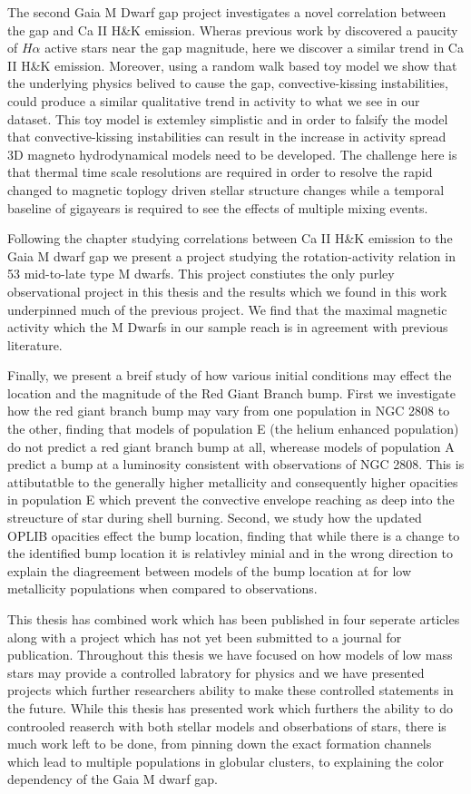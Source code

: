 The second Gaia M Dwarf gap project investigates a novel correlation between
the gap and Ca II H\&K emission. Wheras previous work by \citet{Jao2023}
discovered a paucity of $H\alpha$ active stars near the gap magnitude, here we
discover a similar trend in Ca II H\&K emission. Moreover, using a random walk
based toy model we show that the underlying physics belived to cause the gap,
convective-kissing instabilities, could produce a similar qualitative trend in
activity to what we see in our dataset. This toy model is extemley simplistic
and in order to falsify the model that convective-kissing instabilities can
result in the increase in activity spread 3D magneto hydrodynamical models need
to be developed. The challenge here is that thermal time scale resolutions are
required  in order to resolve the rapid changed to magnetic toplogy driven
stellar structure changes while a temporal baseline of gigayears is required to
see the effects of multiple mixing events. 

Following the chapter studying correlations between Ca II H\&K emission to the
Gaia M dwarf gap we present a project studying the rotation-activity relation
in 53 mid-to-late type M dwarfs. This project constiutes the only purley
observational project in this thesis and the results which we found in this
work underpinned much of the previous project. We find that the maximal
magnetic activity which the M Dwarfs in our sample reach is in agreement with
previous literature.

Finally, we present a breif study of how various initial conditions may effect
the location and the magnitude of the Red Giant Branch bump. First we
investigate how the red giant branch bump may vary from one population in NGC
2808 to the other, finding that models of population E (the helium enhanced
population) do not predict a red giant branch bump at all, wherease models of
population A predict a bump at a luminosity consistent with observations of NGC
2808. This is attibutatble to the generally higher metallicity and consequently
higher opacities in population E which prevent the convective envelope reaching
as deep into the streucture of star during shell burning. Second, we study how
the updated OPLIB opacities effect the bump location, finding that while there
is a change to the identified bump location it is relativley minial and in the
wrong direction to explain the {\color{red} diagreement between models of the
bump location at for low metallicity populations when compared to
observations.}

This thesis has combined work which has been published in four seperate
articles along with a project which has not yet been submitted to a journal for
publication. Throughout this thesis we have focused on how models of low mass
stars may provide a controlled labratory for physics and we have presented
projects which further researchers ability to make these controlled statements
in the future. While this thesis has presented work which furthers the ability
to do controoled reaserch with both stellar models and obserbations of stars,
there is much work left to be done, from pinning down the exact formation
channels which lead to multiple populations in globular clusters, to explaining
the color dependency of the Gaia M dwarf gap.

